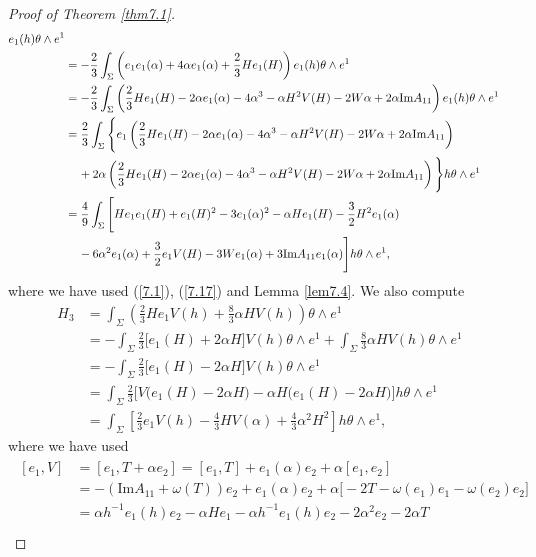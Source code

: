 \documentclass{amsart}
\theoremstyle{Corollary}
\numberwithin{equation}{section}
\begin{document}
\begin{proof}[Proof of Theorem \ref{thm7.1}]
\begin{align*}
e_1(h)\theta\wedge e^1\\
&=-\frac{2}{3}\int_\Sigma\left(e_1e_1(\alpha)+4\alpha e_1(\alpha)+\frac{2}{3}He_1(H)\right)e_1(h)\theta\wedge e^1\\
&=-\frac{2}{3}\int_\Sigma\left(\frac{2}{3}He_1(H)
-2\alpha e_1(\alpha)-4\alpha^3-\alpha H^2
V(H)-2W\alpha+2\alpha \mbox{Im}A_{11}
\right)e_1(h)\theta\wedge e^1\\
&=\frac{2}{3}\int_\Sigma \Bigg\{e_1\left(\frac{2}{3}He_1(H)
-2\alpha e_1(\alpha)-4\alpha^3-\alpha H^2
V(H)-2W\alpha+2\alpha \mbox{Im}A_{11}
\right)\\
&\hspace{4mm}+2\alpha\left(\frac{2}{3}He_1(H)
-2\alpha e_1(\alpha)-4\alpha^3-\alpha H^2
V(H)-2W\alpha+2\alpha \mbox{Im}A_{11}
\right)\Bigg\}h\theta\wedge e^1\\
&=\frac{4}{9}
\int_\Sigma\Bigg[He_1e_1(H)+e_1(H)^2-3e_1(\alpha)^2-\alpha He_1(H)-\frac{3}{2}H^2e_1(\alpha)\\
&\hspace{4mm}-6\alpha^2e_1(\alpha)+\frac{3}{2}e_1V(H)-3We_1(\alpha)+3\mbox{Im}A_{11}e_1(\alpha)\Bigg]h\theta\wedge e^1,
\end{align*}
where we have used (\ref{7.1}), (\ref{7.17}) and Lemma \ref{lem7.4}. 
We also compute 
\begin{align*}
H_3&=\int_\Sigma\left(\frac{2}{3}H e_1V(h)+\frac{8}{3}\alpha H V(h)\right)\theta\wedge e^1\\
&=-\int_\Sigma\frac{2}{3}\big[e_1(H)+2\alpha H\big]V(h)\theta\wedge e^1
+\int_\Sigma\frac{8}{3}\alpha HV(h)\theta\wedge e^1\\
&=-\int_\Sigma\frac{2}{3}\big[e_1(H)-2\alpha H\big]V(h)\theta\wedge e^1\\
&=\int_\Sigma \frac{2}{3}\Big[V\big(e_1(H)-2\alpha H\big)-\alpha H\big(e_1(H)-2\alpha H\big)\Big]h\theta\wedge e^1\\
&=\int_\Sigma\left[\frac{2}{3}e_1V(h)-\frac{4}{3}HV(\alpha)+\frac{4}{3}\alpha^2H^2\right] h\theta\wedge e^1,
\end{align*}
where we have used 
\begin{align}\label{7.35}
\begin{split}
[e_1,V]&=[e_1,T+\alpha e_2]=[e_1,T]+e_1(\alpha)e_2+\alpha[e_1,e_2]\\
&=-(\mbox{Im}A_{11}+\omega(T))e_2+e_1(\alpha)e_2+\alpha\big[-2T-\omega(e_1)e_1-\omega(e_2)e_2\big]\\
&=\alpha h^{-1}e_1(h)e_2-\alpha He_1-\alpha h^{-1} e_1(h) e_2-2\alpha^2 e_2-2\alpha T\\

\end{split}
\end{align}
\end{proof}
\end{document}
